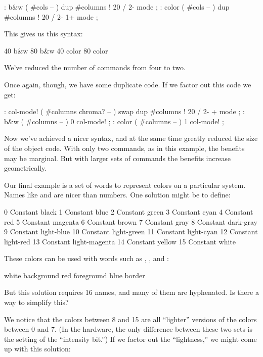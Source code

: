 \begin{Code}
: b&w    ( #cols -- )  dup #columns !  20 /  2-     mode ;
: color  ( #cols -- )  dup #columns !  20 /  2-  1+ mode ;
\end{Code}
This gives us this syntax:

\begin{Code}
40 b&w
80 b&w
40 color
80 color
\end{Code}
We've reduced the number of commands from four to two.

Once again, though, we have some duplicate code. If we factor out this
code we get:

\begin{Code}
: col-mode!  ( #columns chroma? -- )
   swap dup #columns !  20 / 2-  +  mode ;
: b&w    ( #columns -- )  0 col-mode! ;
: color  ( #columns -- )  1 col-mode! ;
\end{Code}
Now we've achieved a nicer syntax, and at the same time greatly
reduced the size of the object code. With only two commands, as in
this example, the benefits may be marginal. But with larger sets of
commands the benefits increase geometrically.

Our final example is a set of words to represent colors on a
particular system. Names like  and  are nicer
than numbers. One solution might be to define:

\begin{Code}
 0 Constant black                 1 Constant blue
 2 Constant green                 3 Constant cyan
 4 Constant red                   5 Constant magenta
 6 Constant brown                 7 Constant gray
 8 Constant dark-gray             9 Constant light-blue
10 Constant light-green          11 Constant light-cyan
12 Constant light-red            13 Constant light-magenta
14 Constant yellow               15 Constant white
\end{Code}
These colors can be used with words such as ,
, and :

\begin{Code}
white background  red foreground  blue border
\end{Code}
But this solution requires 16 names, and many of them are hyphenated.
Is there a way to simplify this?

We notice that the colors between 8 and 15 are all ``lighter''
versions of the colors between 0 and 7. (In the hardware, the only
difference between these two sets is the setting of the ``intensity
bit.'') If we factor out the ``lightness,'' we might come up with this
solution:

